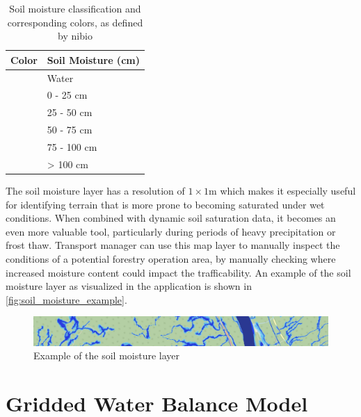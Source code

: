 \begin{table}[h]
    \centering
    \begin{tabular}{|l|l|}
        \hline  
        \textbf{Color} & \textbf{Soil Moisture (cm)} \\
        \hline
        \cellcolor[HTML]{000080} & Water \\
        \hline
        \cellcolor[HTML]{0000ff} & 0 - 25 cm \\
        \hline
        \cellcolor[HTML]{1e90ff} & 25 - 50 cm \\
        \hline
        \cellcolor[HTML]{00bfff} & 50 - 75 cm \\
        \hline
        \cellcolor[HTML]{87cefa} & 75 - 100 cm \\
        \hline
        \cellcolor[HTML]{ffffff} & > 100 cm \\
        \hline
    \end{tabular}
    \caption[Soil moisture classification and corresponding colors]{Soil moisture classification and corresponding colors, as defined by \acrshort{nibio} \cite{geonorge_soil_moisture}}
    \label{tab:soil_moisture_classification}
\end{table}

The soil moisture layer has a resolution of $1 \times 1$m which makes it especially useful for identifying terrain that is more prone to becoming saturated under wet conditions. When combined with dynamic soil saturation data, it becomes an even more valuable tool, particularly during periods of heavy precipitation or frost thaw. Transport manager can use this map layer to manually inspect the conditions of a potential forestry operation area, by manually checking where increased moisture content could impact the trafficability. An example of the soil moisture layer as visualized in the application is shown in \autoref{fig:soil_moisture_example}.

\begin{figure}[h]
    \centering
    \includegraphics[width=1\linewidth]{images/maplayers/markfuktighet.png}
    \caption{Example of the soil moisture layer}
    \label{fig:soil_moisture_example}
\end{figure}

\section{Gridded Water Balance Model}

